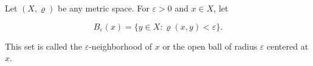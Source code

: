 Let $(X, \varrho)$ be any metric space. For $\varepsilon > 0$ and $x \in X$, let

$$B_{\varepsilon}(x) = \{y \in X : \varrho(x, y) < \varepsilon\}.$$

This set is called the $\varepsilon$-neighborhood of $x$ or the open ball of radius $\varepsilon$ centered at $x$.
